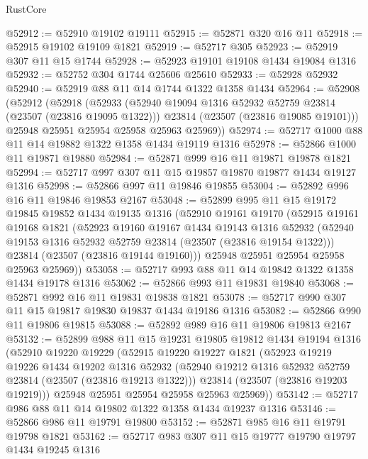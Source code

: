 \begin{lexlean}{RustCore}
\begin{coremodule}
@52912 := @52910 @19102 @19111
@52915 := @52871 @320 @16 @11
@52918 := @52915 @19102 @19109 @1821
@52919 := @52717 @305
@52923 := @52919 @307 @11 @15 @1744
@52928 := @52923 @19101 @19108 @1434 @19084 @1316
@52932 := @52752 @304 @1744 @25606 @25610
@52933 := @52928 @52932
@52940 := @52919 @88 @11 @14 @1744 @1322 @1358 @1434
@52964 := @52908
    (@52912
      (@52918
        (@52933
          (@52940 @19094 @1316 @52932 @52759 @23814 (@23507 (@23816 @19095 @1322)))
          @23814
          (@23507 (@23816 @19085 @19101)))
        @25948
        @25951
        @25954
        @25958
        @25963
        @25969))
@52974 := @52717 @1000 @88 @11 @14 @19882 @1322 @1358 @1434 @19119 @1316
@52978 := @52866 @1000 @11 @19871 @19880
@52984 := @52871 @999 @16 @11 @19871 @19878 @1821
@52994 := @52717 @997 @307 @11 @15 @19857 @19870 @19877 @1434 @19127 @1316
@52998 := @52866 @997 @11 @19846 @19855
@53004 := @52892 @996 @16 @11 @19846 @19853 @2167
@53048 := @52899
    @995
    @11
    @15
    @19172
    @19845
    @19852
    @1434
    @19135
    @1316
    (@52910
      @19161
      @19170
      (@52915
        @19161
        @19168
        @1821
        (@52923
          @19160
          @19167
          @1434
          @19143
          @1316
          @52932
          (@52940 @19153 @1316 @52932 @52759 @23814 (@23507 (@23816 @19154 @1322)))
          @23814
          (@23507 (@23816 @19144 @19160)))
        @25948
        @25951
        @25954
        @25958
        @25963
        @25969))
@53058 := @52717 @993 @88 @11 @14 @19842 @1322 @1358 @1434 @19178 @1316
@53062 := @52866 @993 @11 @19831 @19840
@53068 := @52871 @992 @16 @11 @19831 @19838 @1821
@53078 := @52717 @990 @307 @11 @15 @19817 @19830 @19837 @1434 @19186 @1316
@53082 := @52866 @990 @11 @19806 @19815
@53088 := @52892 @989 @16 @11 @19806 @19813 @2167
@53132 := @52899
    @988
    @11
    @15
    @19231
    @19805
    @19812
    @1434
    @19194
    @1316
    (@52910
      @19220
      @19229
      (@52915
        @19220
        @19227
        @1821
        (@52923
          @19219
          @19226
          @1434
          @19202
          @1316
          @52932
          (@52940 @19212 @1316 @52932 @52759 @23814 (@23507 (@23816 @19213 @1322)))
          @23814
          (@23507 (@23816 @19203 @19219)))
        @25948
        @25951
        @25954
        @25958
        @25963
        @25969))
@53142 := @52717 @986 @88 @11 @14 @19802 @1322 @1358 @1434 @19237 @1316
@53146 := @52866 @986 @11 @19791 @19800
@53152 := @52871 @985 @16 @11 @19791 @19798 @1821
@53162 := @52717 @983 @307 @11 @15 @19777 @19790 @19797 @1434 @19245 @1316

\end{coremodule}
\end{lexlean}
